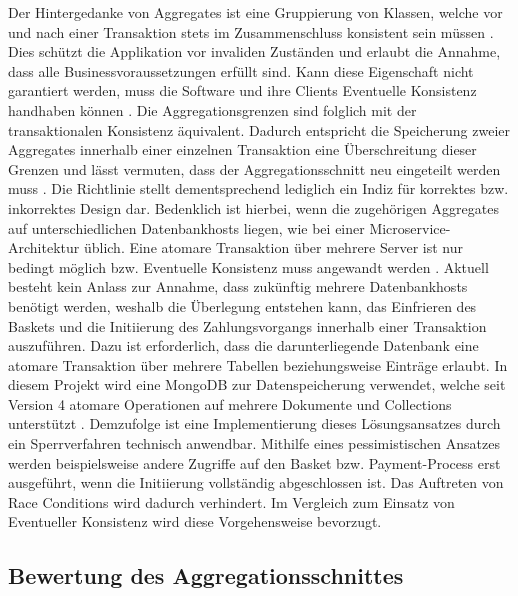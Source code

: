 Der Hintergedanke von Aggregates ist eine Gruppierung von Klassen, welche vor und nach einer Transaktion stets im Zusammenschluss konsistent sein müssen \cite[S. 128f.]{Evans.2011}. Dies schützt die Applikation vor invaliden Zuständen und erlaubt die Annahme, dass alle Businessvoraussetzungen erfüllt sind. Kann diese Eigenschaft nicht garantiert werden, muss die Software und ihre Clients Eventuelle Konsistenz handhaben können \cite[S. 364]{Vernon.2015}. Die Aggregationsgrenzen sind folglich mit der transaktionalen Konsistenz äquivalent. Dadurch entspricht die Speicherung zweier Aggregates innerhalb einer einzelnen Transaktion eine Überschreitung dieser Grenzen und lässt vermuten, dass der Aggregationsschnitt neu eingeteilt werden muss \cite[S. 358f.]{Vernon.2015}. Die Richtlinie stellt dementsprechend lediglich ein Indiz für korrektes bzw. inkorrektes Design  dar. Bedenklich ist hierbei, wenn die zugehörigen Aggregates auf unterschiedlichen Datenbankhosts liegen, wie bei einer Microservice-Architektur üblich. Eine atomare Transaktion über mehrere Server ist nur bedingt möglich bzw. Eventuelle Konsistenz muss angewandt werden \cite{Fowler.2014}. Aktuell besteht kein Anlass zur Annahme, dass zukünftig mehrere Datenbankhosts benötigt werden, weshalb die Überlegung entstehen kann, das Einfrieren des Baskets und die Initiierung des Zahlungsvorgangs innerhalb einer Transaktion auszuführen. Dazu ist erforderlich, dass die darunterliegende Datenbank eine atomare Transaktion über mehrere Tabellen beziehungsweise Einträge erlaubt. In diesem Projekt wird eine MongoDB zur Datenspeicherung verwendet, welche seit Version 4 atomare Operationen auf mehrere Dokumente und Collections unterstützt \cite{mongodb.atomicity}. Demzufolge ist eine Implementierung dieses Lösungsansatzes durch ein Sperrverfahren technisch anwendbar. Mithilfe eines pessimistischen Ansatzes werden beispielsweise andere Zugriffe auf den Basket bzw. Payment-Process erst ausgeführt, wenn die Initiierung vollständig abgeschlossen ist. Das Auftreten von Race Conditions wird dadurch verhindert. \cite{Graefe.2016} Im Vergleich zum Einsatz von Eventueller Konsistenz wird diese Vorgehensweise bevorzugt.

\subsection{Bewertung des Aggregationsschnittes}

